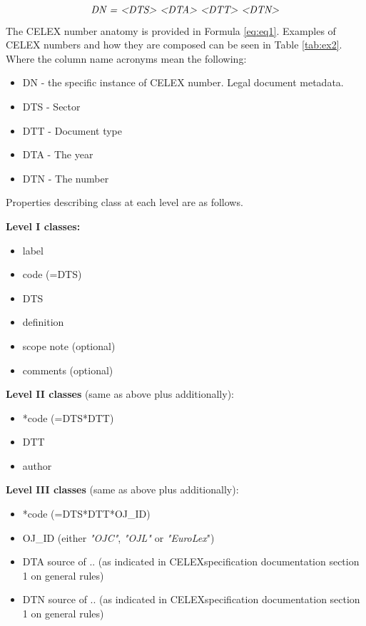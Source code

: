 \begin{equation}
	\emph{DN =
		\textless{}DTS\textgreater{} \textless{}DTA\textgreater{}
		\textless{}DTT\textgreater{} \textless{}DTN\textgreater{}}
	\label{eq:eq1}
\end{equation}

The CELEX number anatomy is provided in Formula \ref{eq:eq1}. Examples of
CELEX numbers and how they are composed can be seen in Table \ref{tab:ex2}. Where the
column name acronyms mean the following:

\begin{itemize}

\item
  DN - the specific instance of CELEX number. Legal document metadata.
\item
  DTS - Sector
\item
  DTT - Document type
\item
  DTA - The year
\item
  DTN - The number
\end{itemize}



Properties describing class at each level are as follows.

\textbf{Level I classes:}

\begin{itemize}

\item
  label
\item
  code (=DTS)
\item
  DTS
\item
  definition
\item
  scope note (optional)
\item
  comments (optional)
\end{itemize}

\textbf{Level II classes} (same as above plus additionally):

\begin{itemize}

\item
  *code (=DTS*DTT)
\item
  DTT
\item
  author
\end{itemize}

\textbf{Level III classes} (same as above plus additionally):

\begin{itemize}

\item
  *code (=DTS*DTT*OJ\_ID)
\item
  OJ\_ID (either \emph{"OJC"}, \emph{"OJL"} or \emph{"EuroLex}")
\item
  DTA source of .. (as indicated in CELEXspecification documentation
  section 1 on general rules)
\item
  DTN source of .. (as indicated in CELEXspecification documentation
  section 1 on general rules)
\end{itemize}


